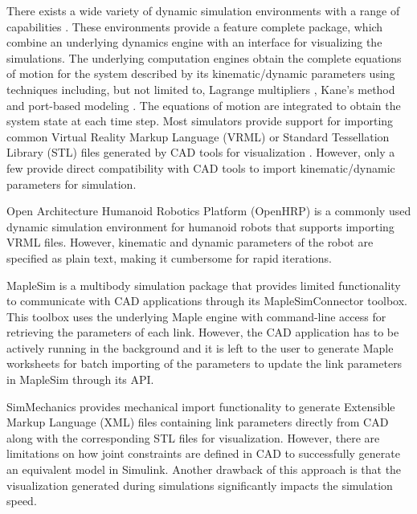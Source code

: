 There exists a wide variety of dynamic simulation environments with a range of capabilities \cite{Koenig04designand,michel2004webotstm, Kanehiro:2004dq, PonticelliCWR2006, Reichenbach2009, MedranoCerda2010}. These environments provide a feature complete package, which combine an underlying dynamics engine with an interface for visualizing the simulations. The underlying computation engines obtain the complete equations of motion for the system described by its kinematic/dynamic parameters using techniques including, but not limited to, Lagrange multipliers \cite{Baraff1996}, Kane's method \cite{Rosenthal1986} and port-based modeling \cite{Paredis2001}. The equations of motion are integrated to obtain the system state at each time step. Most simulators provide support for importing common Virtual Reality Markup Language (VRML) or Standard Tessellation Library (STL) files generated by CAD tools for visualization \cite{Koenig04designand,michel2004webotstm}. However, only a few provide direct compatibility with CAD tools to import kinematic/dynamic parameters for simulation.

Open Architecture Humanoid Robotics Platform (OpenHRP) \cite{Kanehiro:2004dq} is a commonly used dynamic simulation environment for humanoid robots that supports importing VRML files. However, kinematic and dynamic parameters of the robot are specified as plain text, making it cumbersome for rapid iterations.

MapleSim \cite{sw:maplesim} is a multibody simulation package that provides limited functionality to communicate with CAD applications through its MapleSimConnector toolbox. This toolbox uses the underlying Maple engine with command-line access for retrieving the parameters of each link. However, the CAD application has to be actively running in the background and it is left to the user to generate Maple worksheets for batch importing of the parameters to update the link parameters in MapleSim through its API.

SimMechanics \cite{sw:simmech} provides mechanical import functionality to generate Extensible Markup Language (XML) files containing link parameters directly from CAD along with the corresponding STL files for visualization. However, there are limitations on how joint constraints are defined in CAD to successfully generate an equivalent model in Simulink. Another drawback of this approach is that the visualization generated during simulations significantly impacts the simulation speed.

